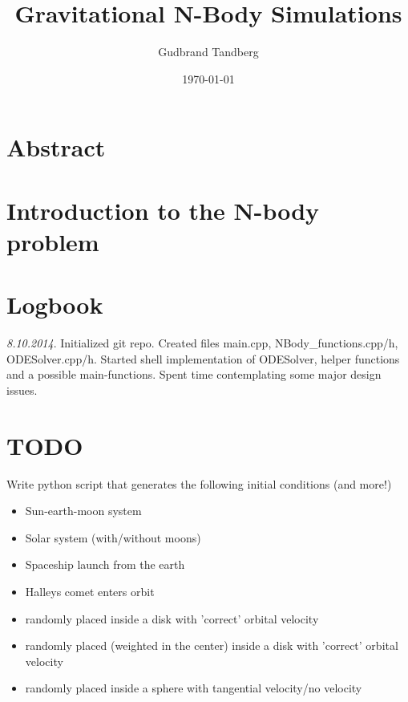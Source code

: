 \documentclass[11pt, oneside]{article}   	%
\title{Gravitational N-Body Simulations}
\author{Gudbrand Tandberg}
\date{\today}							%
\begin{document}
\maketitle
\newpage


\section{Abstract}

\section{Introduction to the N-body problem}




\newpage
\section{Logbook}

\emph{8.10.2014}. 
Initialized git repo. Created files main.cpp, NBody\_functions.cpp/h, ODESolver.cpp/h. Started shell implementation of ODESolver, helper functions and a possible main-functions. Spent time contemplating some major design issues. 

\newpage

\section{TODO}

Write python script that generates the following initial conditions (and more!)
\begin{itemize}

\item Sun-earth-moon system
\item Solar system (with/without moons)
\item Spaceship launch from the earth
\item Halleys comet enters orbit

\item randomly placed inside a disk with 'correct' orbital velocity
\item randomly placed (weighted in the center) inside a disk with 'correct' orbital velocity
\item randomly placed inside a sphere with tangential velocity/no velocity

\end{itemize}
\end{document}
